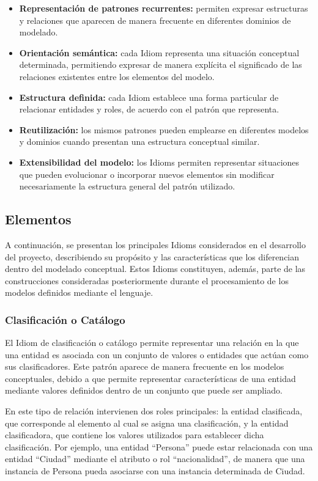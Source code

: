 \begin{itemize}
    \item \textbf{Representación de patrones recurrentes:} permiten expresar estructuras y relaciones que aparecen de manera frecuente en diferentes dominios de modelado.
    \item \textbf{Orientación semántica:} cada Idiom representa una situación conceptual determinada, permitiendo expresar de manera explícita el significado de las relaciones existentes entre los elementos del modelo.
    \item \textbf{Estructura definida:} cada Idiom establece una forma particular de relacionar entidades y roles, de acuerdo con el patrón que representa.
    \item \textbf{Reutilización:} los mismos patrones pueden emplearse en diferentes modelos y dominios cuando presentan una estructura conceptual similar.
    \item \textbf{Extensibilidad del modelo:} los Idioms permiten representar situaciones que pueden evolucionar o incorporar nuevos elementos sin modificar necesariamente la estructura general del patrón utilizado.
\end{itemize}

\subsection{Elementos}
\label{subsec: idioms-elementos}

A continuación, se presentan los principales Idioms considerados en el desarrollo del proyecto, describiendo su propósito y las características que los diferencian dentro del modelado conceptual. Estos Idioms constituyen, además, parte de las construcciones consideradas posteriormente durante el procesamiento de los modelos definidos mediante el lenguaje.

\subsubsection{Clasificación o Catálogo}
El Idiom de clasificación o catálogo permite representar una relación en la que una entidad es asociada con un conjunto de valores o entidades que actúan como sus clasificadores. Este patrón aparece de manera frecuente en los modelos conceptuales, debido a que permite representar características de una entidad mediante valores definidos dentro de un conjunto que puede ser ampliado.

En este tipo de relación intervienen dos roles principales: la entidad clasificada, que corresponde al elemento al cual se asigna una clasificación, y la entidad clasificadora, que contiene los valores utilizados para establecer dicha clasificación. Por ejemplo, una entidad “Persona” puede estar relacionada con una entidad “Ciudad” mediante el atributo o rol “nacionalidad”, de manera que una instancia de Persona pueda asociarse con una instancia determinada de Ciudad.

